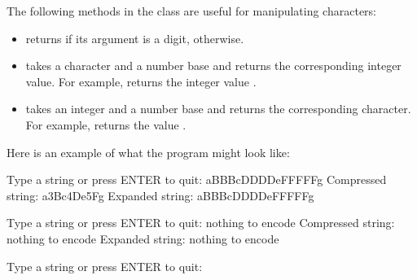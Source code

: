 \begin{exercise}



The following methods in the  class are useful for manipulating characters:
\begin{itemize}
\item {} returns  if its  argument is a digit,  otherwise.
\item {} takes a character and a number base and returns the corresponding integer value. For example,  returns the integer value .
\item {} takes an integer and a number base and returns the corresponding character. For example,  returns the  value .
\end{itemize}

Here is an example of what the program might look like:

\begin{stdout}
Type a string or press ENTER to quit: aBBBcDDDDeFFFFFg
Compressed string: a3Bc4De5Fg
Expanded string: aBBBcDDDDeFFFFFg

Type a string or press ENTER to quit: nothing to encode
Compressed string: nothing to encode
Expanded string: nothing to encode

Type a string or press ENTER to quit: 
\end{stdout}
\end{exercise}
